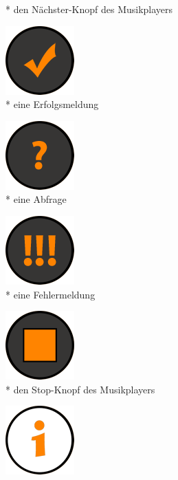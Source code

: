 \documentclass[FIPLY_base.tex]{subfiles}
\begin{document}
\begin{figure}[H]
\begin{subfigure}[b]{0.2\textwidth}
			\caption{* den Nächster-Knopf des Musikplayers}
		\end{subfigure}
		\hfil
		\begin{subfigure}[b]{0.2\textwidth}
			\includegraphics[scale=0.4]{img/icons/successsmall}
			\caption{* eine Erfolgsmeldung}
		\end{subfigure}
		\hfil
		\begin{subfigure}[b]{0.2\textwidth}
			\includegraphics[scale=0.4]{img/icons/questionsmall}
			\caption{* eine Abfrage}
		\end{subfigure}
		\hfil
		\begin{subfigure}[b]{0.2\textwidth}
			\includegraphics[scale=0.4]{img/icons/alertsmall}
			\caption{* eine Fehlermeldung}
		\end{subfigure}
		\hfil
		\begin{subfigure}[b]{0.2\textwidth}
			\includegraphics[scale=0.4]{img/icons/stop}
			\caption{* den Stop-Knopf des Musikplayers}
		\end{subfigure}
		\hfil
		\begin{subfigure}[b]{0.2\textwidth}
			\includegraphics[scale=0.4]{img/icons/informationsmall}

\end{subfigure}
\end{figure}
\end{document}
